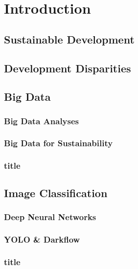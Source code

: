 	
	\section{Introduction}
		
		
		\subsection{Sustainable Development}
		
		
		
		\subsection{Development Disparities}
		
		
		
		\subsection{Big Data}
			\subsubsection{Big Data Analyses}
			
			\subsubsection{Big Data for Sustainability}
			
			\subsubsection{title}
			
			
			
		\subsection{Image Classification}
			\subsubsection{Deep Neural Networks}
			
			\subsubsection{YOLO \& Darkflow}
			
			\subsubsection{title}
			
